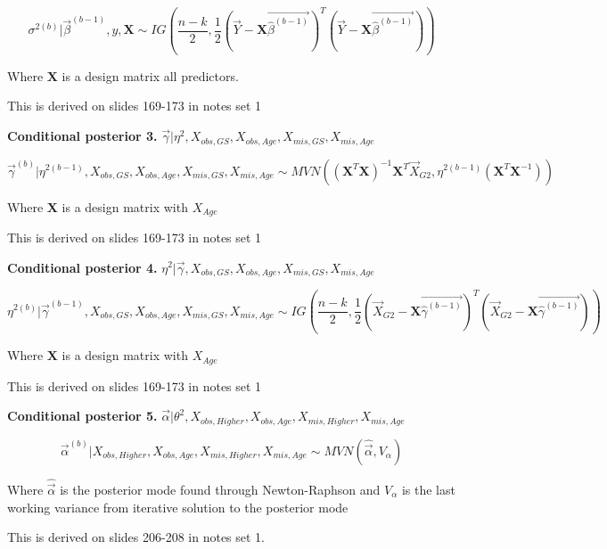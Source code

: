\documentclass[11pt]{article}
\begin{document}
$$\sigma^{2(b)} | \vec\beta^{(b - 1)}, y, \mathbf{X} \sim IG\left(\frac{n - k}{2}, \frac{1}{2}(\vec{Y} - \mathbf{X}\vec{\hat\beta^{(b - 1)}})^T(\vec{Y} - \mathbf{X}\vec{\hat\beta^{(b - 1)}})\right)$$

Where $\mathbf{X}$ is a design matrix all predictors.

This is derived on slides 169-173 in notes set 1

\vspace{0.25in}

\textbf{Conditional posterior 3.} $\vec{\gamma}|\eta^2, X_{obs, GS}, X_{obs, Age}, X_{mis, GS}, X_{mis, Age}$

$$\vec{\gamma}^{(b)}|\eta^{2(b - 1)}, X_{obs, GS}, X_{obs, Age}, X_{mis, GS}, X_{mis, Age} \sim MVN((\mathbf{X}^T\mathbf{X})^{-1}\mathbf{X}^T\vec{X}_{G2}, \eta^{2(b - 1)}(\mathbf{X}^T\mathbf{X}^{-1}))$$

Where $\mathbf{X}$ is a design matrix with $X_{Age}$

This is derived on slides 169-173 in notes set 1

\vspace{0.25in}

\textbf{Conditional posterior 4.} $\eta^2|\vec{\gamma}, X_{obs, GS}, X_{obs, Age}, X_{mis, GS}, X_{mis, Age}$

$$\eta^{2(b)}|\vec{\gamma}^{(b - 1)}, X_{obs, GS}, X_{obs, Age}, X_{mis, GS}, X_{mis, Age} \sim IG\left(\frac{n - k}{2}, \frac{1}{2}(\vec{X}_{G2} - \mathbf{X}\vec{\hat\gamma^{(b - 1)}})^T(\vec{X}_{G2} - \mathbf{X}\vec{\hat\gamma^{(b - 1)}})\right)$$

Where $\mathbf{X}$ is a design matrix with $X_{Age}$

This is derived on slides 169-173 in notes set 1

\vspace{0.25in}

\textbf{Conditional posterior 5.} $\vec\alpha| \theta^2, X_{obs, Higher}, X_{obs, Age}, X_{mis, Higher}, X_{mis, Age}$

$$\vec\alpha^{(b)}|  X_{obs, Higher}, X_{obs, Age}, X_{mis, Higher}, X_{mis, Age} \sim MVN(\hat{\vec\alpha}, V_{\alpha})$$

Where $\hat{\vec\alpha}$ is the posterior mode found through Newton-Raphson and $V_{\alpha}$ is the last working variance from iterative solution to the posterior mode

This is derived on slides 206-208 in notes set 1.

\newpage



\end{document}
